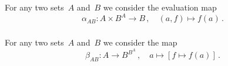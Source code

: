 \subsection{}



\subsubsection{}

For any two sets~$A$ and~$B$ we consider the evaluation map
\[
	α_{AB}
	\colon
	A × B^A \to B \,,
	\quad
	(a, f) \mapsto f(a) \,.
\]



\subsubsection{}

For any two sets~$A$ and~$B$ we consider the map
\[
	β_{AB}
	\colon
	A \to B^{B^A} \,,
	\quad
	a \mapsto [f \mapsto f(a)] \,.
\]





